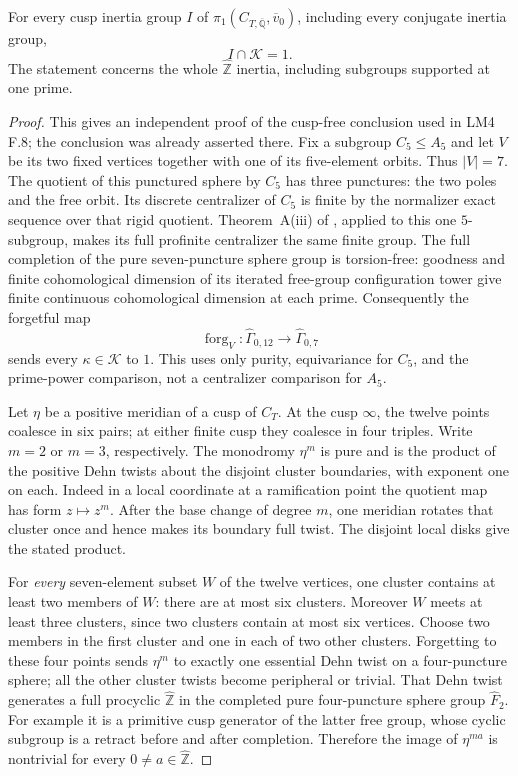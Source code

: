 For every cusp inertia group $I$ of
$\pi_1(C_{T,\overline{\mathbb Q}},\overline v_0)$,
including every conjugate inertia group,
\[
                             I\cap\mathcal K=1.           \tag{B.32.1}
\]
The statement concerns the whole $\widehat{\mathbb Z}$
inertia, including subgroups supported at one prime.

\begin{proof}
This gives an independent proof of the cusp-free conclusion
used in LM4 F.8; the conclusion was already asserted there.
Fix a subgroup $C_5\leq A_5$ and let $V$ be its two
fixed vertices together with one of its five-element
orbits.  Thus $|V|=7$.  The quotient of this punctured
sphere by $C_5$ has three punctures: the two poles
and the free orbit.  Its discrete centralizer of
$C_5$ is finite by the normalizer exact sequence
over that rigid quotient.  Theorem~A(iii) of
\cite{CEBoggiZalesskii2025}, applied to this one
$5$-subgroup, makes its full profinite centralizer
the same finite group.  The full completion of
the pure seven-puncture sphere group is torsion-free:
goodness and finite cohomological dimension of its
iterated free-group configuration tower give finite
continuous cohomological dimension at each prime.
Consequently the forgetful map
\[
 \operatorname{forg}_V:\widehat\Gamma_{0,12}
                         \longrightarrow\widehat\Gamma_{0,7}
\]
sends every $\kappa\in\mathcal K$ to $1$.  This uses
only purity, equivariance for $C_5$, and the prime-power
comparison, not a centralizer comparison for $A_5$.

Let $\eta$ be a positive meridian of a cusp of $C_T$.
At the cusp $\infty$, the twelve points coalesce in
six pairs; at either finite cusp they coalesce in
four triples.  Write $m=2$ or $m=3$, respectively.
The monodromy $\eta^m$ is pure and is the product
of the positive Dehn twists about the disjoint
cluster boundaries, with exponent one on each.
Indeed in a local coordinate at a ramification
point the quotient map has form $z\mapsto z^m$.
After the base change of degree $m$, one meridian
rotates that cluster once and hence makes its
boundary full twist.  The disjoint local disks
give the stated product.

For \emph{every} seven-element subset $W$ of the
twelve vertices, one cluster contains at least two
members of $W$: there are at most six clusters.
Moreover $W$ meets at least three clusters, since
two clusters contain at most six vertices.  Choose
two members in the first cluster and one in each
of two other clusters.  Forgetting to these four
points sends $\eta^m$ to exactly one essential
Dehn twist on a four-puncture sphere; all the
other cluster twists become peripheral or trivial.
That Dehn twist generates a full procyclic
$\widehat{\mathbb Z}$ in the completed pure
four-puncture sphere group $\widehat F_2$.
For example it is a primitive cusp generator of
the latter free group, whose cyclic subgroup is
a retract before and after completion.  Therefore
the image of $\eta^{ma}$ is nontrivial for every
$0\ne a\in\widehat{\mathbb Z}$.


\end{proof}
